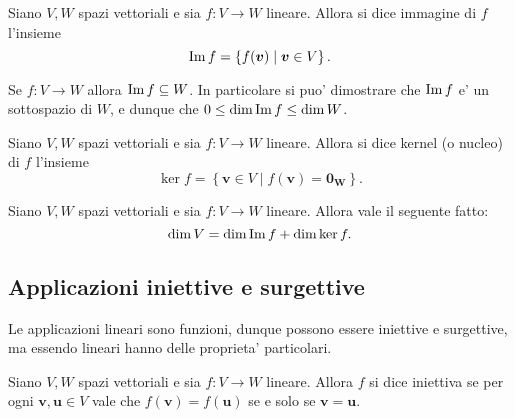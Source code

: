 \begin{definition}
    Siano $V, W$ spazi vettoriali e sia $f : V \to W$ lineare. Allora si dice immagine di $f$ l'insieme \begin{equation}
        \operatorname{Im}f = \left\{ f(\bm{v}) \mid \bm v \in V\right\}.
    \end{equation}
\end{definition}

\begin{remark}
    Se $f : V \to W$ allora $\operatorname{Im}f \subseteq W$. In particolare si puo' dimostrare che $\operatorname{Im}f$ e' un sottospazio di $W$, e dunque che $0 \leq \dim\operatorname{Im}f \leq \dim W$.
\end{remark}

\begin{definition}
    Siano $V, W$ spazi vettoriali e sia $f : V \to W$ lineare. Allora si dice kernel (o nucleo) di $f$ l'insieme \begin{equation}
        \ker{f} = \left\{ \bm{v} \in V \mid f(\bm v) = \bm{0_W}\right\}.
    \end{equation}
\end{definition}

\begin{theorem} 
     \label{th_dimensioni}
    Siano $V, W$ spazi vettoriali e sia $f : V \to W$ lineare. Allora vale il seguente fatto:
    \begin{equation}
        \dim V = \dim \operatorname{Im}f + \dim \ker f.
    \end{equation}
\end{theorem}

\subsection{Applicazioni iniettive e surgettive}

Le applicazioni lineari sono funzioni, dunque possono essere iniettive e surgettive, ma essendo lineari hanno delle proprieta' particolari.

\begin{definition}
    Siano $V, W$ spazi vettoriali e sia $f : V \to W$ lineare. Allora $f$ si dice iniettiva se per ogni $\bm{v}, \bm{u} \in V$ vale che $f(\bm{v}) = f(\bm{u})$ se e solo se $\bm{v} = \bm{u}$.
\end{definition}

